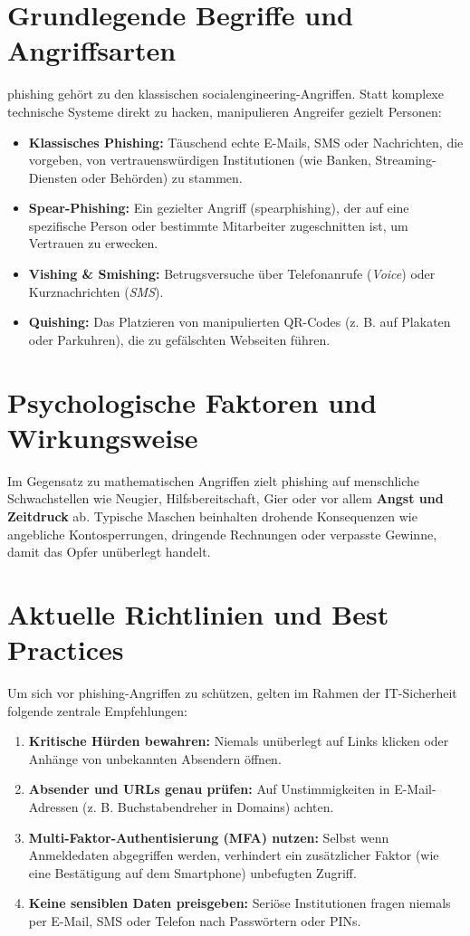 \documentclass[12pt,a4paper]{article}
\begin{document}
\section{Grundlegende Begriffe und Angriffsarten}
\gls{phishing} gehört zu den klassischen \gls{socialengineering}-Angriffen. Statt komplexe technische Systeme direkt zu hacken, manipulieren Angreifer gezielt Personen:
\begin{itemize}
    \item \textbf{Klassisches Phishing:} Täuschend echte E-Mails, SMS oder Nachrichten, die vorgeben, von vertrauenswürdigen Institutionen (wie Banken, Streaming-Diensten oder Behörden) zu stammen.
    \item \textbf{Spear-Phishing:} Ein gezielter Angriff (\gls{spearphishing}), der auf eine spezifische Person oder bestimmte Mitarbeiter zugeschnitten ist, um Vertrauen zu erwecken.
    \item \textbf{Vishing \& Smishing:} Betrugsversuche über Telefonanrufe (\textit{Voice}) oder Kurznachrichten (\textit{SMS}).
    \item \textbf{Quishing:} Das Platzieren von manipulierten QR-Codes (z. B. auf Plakaten oder Parkuhren), die zu gefälschten Webseiten führen.
\end{itemize}

\section{Psychologische Faktoren und Wirkungsweise}
Im Gegensatz zu mathematischen Angriffen zielt \gls{phishing} auf menschliche Schwachstellen wie Neugier, Hilfsbereitschaft, Gier oder vor allem \textbf{Angst und Zeitdruck} ab. Typische Maschen beinhalten drohende Konsequenzen wie angebliche Kontosperrungen, dringende Rechnungen oder verpasste Gewinne, damit das Opfer unüberlegt handelt.

\section{Aktuelle Richtlinien und Best Practices}
Um sich vor \gls{phishing}-Angriffen zu schützen, gelten im Rahmen der IT-Sicherheit folgende zentrale Empfehlungen:

\begin{enumerate}
    \item \textbf{Kritische Hürden bewahren:} Niemals unüberlegt auf Links klicken oder Anhänge von unbekannten Absendern öffnen.
    \item \textbf{Absender und URLs genau prüfen:} Auf Unstimmigkeiten in E-Mail-Adressen (z. B. Buchstabendreher in Domains) achten.
    \item \textbf{Multi-Faktor-Authentisierung (MFA) nutzen:} Selbst wenn Anmeldedaten abgegriffen werden, verhindert ein zusätzlicher Faktor (wie eine Bestätigung auf dem Smartphone) unbefugten Zugriff.
    \item \textbf{Keine sensiblen Daten preisgeben:} Seriöse Institutionen fragen niemals per E-Mail, SMS oder Telefon nach Passwörtern oder PINs.
\end{enumerate}

\printbibliography

\printglossary[type=\acronymtype, title=Akronyme]
\printglossary[title=Glossar]
\end{document}
